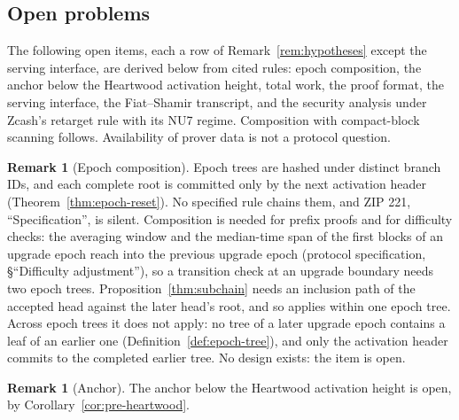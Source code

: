 \documentclass[11pt,a4paper]{article}
\theoremstyle{definition}
\newtheorem{remark}[theorem]{Remark}
\begin{document}
\subsection{Open problems}\label{sec:boundary-open}

The following open items, each a row of Remark~\ref{rem:hypotheses} except
the serving interface, are derived below from cited rules: epoch composition,
the anchor below the Heartwood activation height, total work, the proof format,
the serving interface, the
Fiat--Shamir transcript, and the security analysis under Zcash's retarget
rule with its NU7 regime. Composition with compact-block scanning follows.
Availability of prover data is not a protocol question.

\begin{remark}[Epoch composition]
Epoch trees are hashed under distinct branch IDs, and each complete root is
committed only by the next activation header
(Theorem~\ref{thm:epoch-reset}). No specified rule chains them, and ZIP 221,
``Specification'', is silent. Composition is needed for prefix proofs and for
difficulty checks: the averaging window and the median-time span of the
first blocks of an upgrade epoch reach into the previous upgrade epoch
(protocol specification, \S``Difficulty adjustment''), so a transition
check at an upgrade boundary needs two epoch trees.
Proposition~\ref{thm:subchain} needs an inclusion path of the accepted head
against the later head's root, and so applies within one epoch tree. Across
epoch trees it does not apply: no tree of a later upgrade epoch contains a
leaf of an earlier one (Definition~\ref{def:epoch-tree}), and only the
activation header commits to the completed earlier tree. No design exists:
the item is open.
\end{remark}

\begin{remark}[Anchor]
The anchor below the Heartwood activation height is open, by
Corollary~\ref{cor:pre-heartwood}.
\end{remark}
\end{document}
